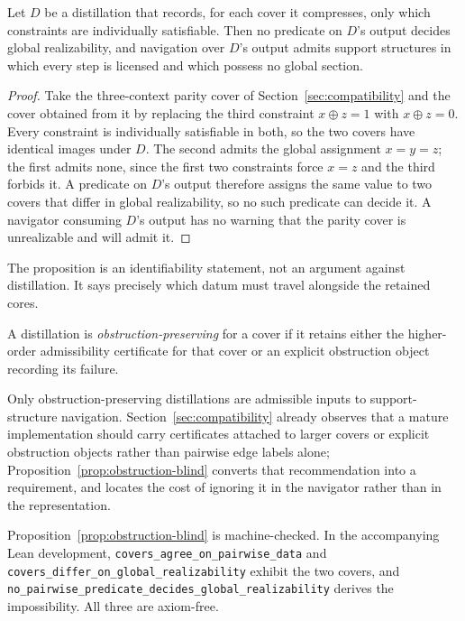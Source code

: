 \begin{proposition}\label{prop:obstruction-blind}
Let \(D\) be a distillation that records, for each cover it compresses, only which constraints are individually satisfiable. Then no predicate on \(D\)'s output decides global realizability, and navigation over \(D\)'s output admits support structures in which every step is licensed and which possess no global section.
\end{proposition}

\begin{proof}
Take the three-context parity cover of Section~\ref{sec:compatibility} and the cover obtained from it by replacing the third constraint \(x\oplus z=1\) with \(x\oplus z=0\). Every constraint is individually satisfiable in both, so the two covers have identical images under \(D\). The second admits the global assignment \(x=y=z\); the first admits none, since the first two constraints force \(x=z\) and the third forbids it. A predicate on \(D\)'s output therefore assigns the same value to two covers that differ in global realizability, so no such predicate can decide it. A navigator consuming \(D\)'s output has no warning that the parity cover is unrealizable and will admit it.
\end{proof}

The proposition is an identifiability statement, not an argument against distillation. It says precisely which datum must travel alongside the retained cores.

\begin{definition}
A distillation is \emph{obstruction-preserving} for a cover if it retains either the higher-order admissibility certificate for that cover or an explicit obstruction object recording its failure.
\end{definition}

Only obstruction-preserving distillations are admissible inputs to support-structure navigation. Section~\ref{sec:compatibility} already observes that a mature implementation should carry certificates attached to larger covers or explicit obstruction objects rather than pairwise edge labels alone; Proposition~\ref{prop:obstruction-blind} converts that recommendation into a requirement, and locates the cost of ignoring it in the navigator rather than in the representation.

\begin{remark}
Proposition~\ref{prop:obstruction-blind} is machine-checked. In the accompanying Lean development, \texttt{covers\_agree\_on\_pairwise\_data} and \texttt{covers\_differ\_on\_global\_realizability} exhibit the two covers, and \texttt{no\_pairwise\_predicate\_decides\_global\_realizability} derives the impossibility. All three are axiom-free.
\end{remark}


